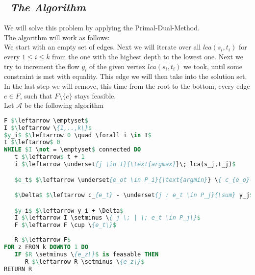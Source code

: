 \subsection*{\itshape~The Algorithm}

We will solve this problem by applying the Primal-Dual-Method.\\

The algorithm will work as follows:\\
We start with an empty set of edges. Next we will iterate over all $lca(s_i,t_i)$ for every $1 \leq i \leq k$
from the one with the highest depth to the lowest one. Next we try to increment the flow $y_i$
of the given vertex $lca(s_i,t_i)$ we took, until some constraint is met with equality. This edge
we will then take into the solution set. In the last step we will remove, this time from the root to the
bottom, every edge $e \in F$, such that $F \setminus \{e\}$ stays feasible.\\

Let $\mathcal{A}$ be the following algorithm\\

\begin{lstlisting}[language=Pascal]
F $\leftarrow \emptyset$
I $\leftarrow \{1,..,k\}$
$y_i$ $\leftarrow 0 \quad \forall i \in I$
t $\leftarrow$ 0
WHILE $I \not = \emptyset$ connected DO
   t $\leftarrow$ t + 1
   i $\leftarrow \underset{j \in I}{\text{argmax}}\; lca(s_j,t_j)$

   $e_t$ $\leftarrow \underset{e_ot \in P_i}{\text{argmin}} \{ c_{e_o}-\underset{j:e_o\in P_j}{\sum} y_j\}$

   $\Delta$ $\leftarrow c_{e_t} - \underset{j : e_t \in P_j}{\sum} y_j$

   $y_i$ $\leftarrow y_i + \Delta$
   I $\leftarrow I \setminus \{ j \; | \; e_t \in P_j\}$
   F $\leftarrow F \cup \{e_t\}$
   
   R $\leftarrow F$
FOR z FROM k DOWNTO 1 DO
   IF $R \setminus \{e_z\}$ is feasable THEN
      R $\leftarrow R \setminus \{e_z\}$
RETURN R
\end{lstlisting}
